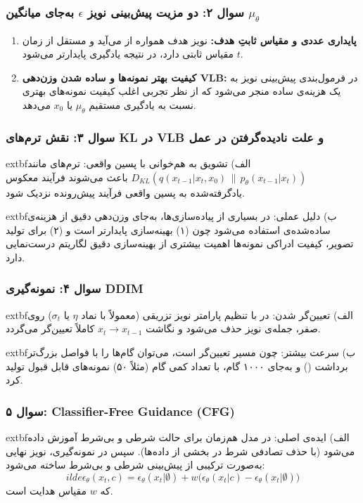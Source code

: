 \subsubsection*{سوال ۲: دو مزیت پیش‌بینی نویز $\epsilon$ به‌جای میانگین $\mu_\theta$}
\begin{enumerate}
    \item \textbf{پایداری عددی و مقیاس ثابتِ هدف:} نویز هدف همواره از  می‌آید و مستقل از زمان $t$ مقیاس ثابتی دارد، در نتیجه یادگیری پایدارتر می‌شود.
    \item \textbf{کیفیت بهتر نمونه‌ها و ساده شدن وزن‌دهی VLB:} در فرمول‌بندی  پیش‌بینی نویز به یک هزینه‌ی  ساده منجر می‌شود که از نظر تجربی اغلب کیفیت نمونه‌های بهتری نسبت به یادگیری مستقیم $\mu_\theta$ یا $x_0$ می‌دهد.
\end{enumerate}

\subsubsection*{سوال ۳: نقش ترم‌های KL در VLB و علت نادیده‌گرفتن در عمل}
	extbf{الف) تشویق به هم‌خوانی با پسین واقعی:}
ترم‌های  مانند
$D_{KL}(q(x_{t-1}|x_t,x_0)\,\|\,p_\theta(x_{t-1}|x_t))$
باعث می‌شوند فرآیند معکوس یادگرفته‌شده به پسین واقعی فرآیند پیش‌رونده نزدیک شود.

        extbf{ب) دلیل عملی:}
در بسیاری از پیاده‌سازی‌ها، به‌جای وزن‌دهی دقیق  از هزینه‌ی ساده‌شده‌ی  استفاده می‌شود چون (۱) بهینه‌سازی پایدارتر است و (۲) برای تولید تصویر، کیفیت ادراکی نمونه‌ها اهمیت بیشتری از بهینه‌سازی دقیق لگاریتم درست‌نمایی دارد.

\subsubsection*{سوال ۴: نمونه‌گیری DDIM}
	extbf{الف) تعیین‌گر شدن:}
در  با تنظیم پارامتر نویز تزریقی (معمولاً با نماد $\eta$ یا $\sigma_t$) روی صفر، جمله‌ی نویز حذف می‌شود و نگاشت $x_t\to x_{t-1}$ کاملاً تعیین‌گر می‌گردد.

        extbf{ب) سرعت بیشتر:}
چون مسیر تعیین‌گر است، می‌توان گام‌ها را با فواصل بزرگ‌تر برداشت () و به‌جای ۱۰۰۰ گام، با تعداد کمی گام (مثلاً ۵۰) نمونه‌های قابل قبول تولید کرد.

\subsubsection*{سوال ۵: Classifier-Free Guidance (CFG)}
	extbf{الف) ایده‌ی اصلی:}
در  مدل هم‌زمان برای حالت شرطی و بی‌شرط آموزش داده می‌شود (با حذف تصادفی شرط در بخشی از داده‌ها). سپس در نمونه‌گیری، نویز نهایی به‌صورت ترکیبی از پیش‌بینی شرطی و بی‌شرط ساخته می‌شود:
\begin{equation}
        ilde{\epsilon}_\theta(x_t,c)=\epsilon_\theta(x_t|\emptyset)+w\big(\epsilon_\theta(x_t|c)-\epsilon_\theta(x_t|\emptyset)\big)
\end{equation}
که $w$ مقیاس هدایت است.

